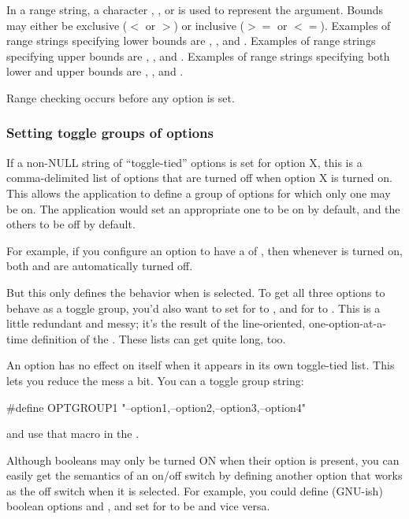 In a range string, a character , , or  is
used to represent the argument. Bounds may either be exclusive ($<$ or
$>$) or inclusive ($>=$ or $<=$). Examples of range strings specifying
lower bounds are , , and
. Examples of range strings specifying upper bounds are
, , and . Examples of
range strings specifying both lower and upper bounds are
, , and .

Range checking occurs before any option is set.



   \subsubsection{Setting toggle groups of options}

If a non-NULL string  of ``toggle-tied'' options
is set for option X, this is a comma-delimited list of options that
are turned off when option X is turned on. This allows the application
to define a group of options for which only one may be on. The
application would set an appropriate one to be on by default, and the
others to be off by default.

For example, if you configure an option  to have a
 of , then whenever  is
turned on, both  and  are automatically turned
off. 

But this only defines the behavior when  is selected.  To
get all three options to behave as a toggle group, you'd also want to
set  for  to , and
 for  to . This is a
little redundant and messy; it's the result of the line-oriented,
one-option-at-a-time definition of the .  These
lists can get quite long, too.

An option has no effect on itself when it appears in its own
toggle-tied list. This lets you reduce the mess a bit. You can
 a toggle group string: 

\begin{cchunk}
  #define OPTGROUP1 "--option1,--option2,--option3,--option4"
\end{cchunk}

and use that  macro in the .

Although booleans may only be turned ON when their option is present,
you can easily get the semantics of an on/off switch by defining
another option that works as the off switch when it is selected. For
example, you could define (GNU-ish) boolean options  and
, and set  for  to be
 and vice versa.  

